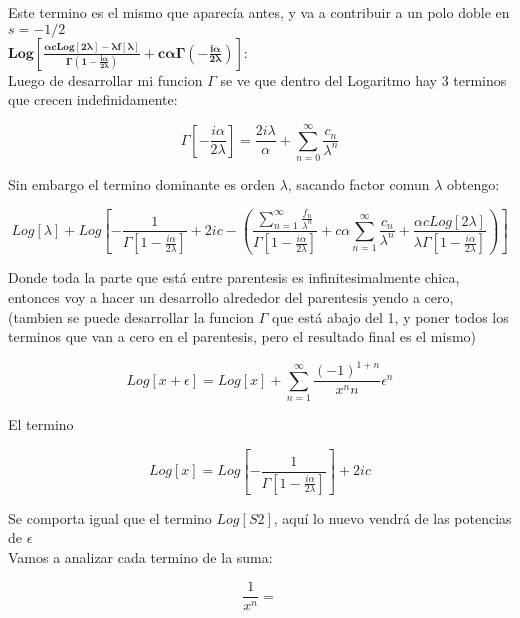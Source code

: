 Este termino es el mismo que aparecía antes, y va a contribuir a un polo doble en $s=-1/2$  \\

$\mathbf{
Log[
	\frac{\alpha c Log[2 \lambda] - \lambda f[\lambda] }{\Gamma (1- \frac{i \alpha}{ 2 \lambda})} + 
	c \alpha \Gamma (- \frac{i \alpha}{2 \lambda}) ] :
}$ \\

Luego de desarrollar mi funcion $\Gamma$ se ve que dentro del Logaritmo hay 3 terminos que crecen indefinidamente:

\begin{equation}
\Gamma [- \frac{i \alpha}{2 \lambda}] = 
\frac{2 i \lambda}{\alpha} + 
\sum _{n=0} ^{\infty} \frac{c _n}{\lambda ^n}
\end{equation}

Sin embargo el termino dominante es orden $\lambda$, sacando factor comun $\lambda$ obtengo:

\begin{equation}
Log[\lambda] + 
Log \left[
	- \frac{1}{\Gamma[1- \frac{i \alpha}{2 \lambda}]} +
	2 i c -
	\left(
		\frac{\sum _{n=1} ^{\infty} \frac{f _n}{\lambda ^n}}
			 {\Gamma[1- \frac{i \alpha}{2 \lambda}]}		
		+ c \alpha \sum _{n=1} ^{\infty} \frac{c _n}{\lambda ^n} +
		\frac{\alpha c Log[2 \lambda]}{\lambda \Gamma [1 - \frac{i \alpha}{2 \lambda} ]}	
		\right)
		\right]		
\end{equation}


Donde toda la parte que está entre parentesis es infinitesimalmente chica, entonces voy a hacer un desarrollo alrededor del parentesis yendo a cero, (tambien se puede desarrollar la funcion $\Gamma$ que está abajo del 1, y poner todos los terminos que van a cero en el parentesis, pero el resultado final es el mismo)

\begin{equation}
Log[x + \epsilon] =
Log[x] + 
\sum _{n=1} ^{\infty}
	\frac{(-1) ^{1+n} }
     	{x ^n n}
     \epsilon ^{n}
\end{equation}

El termino 

\begin{equation}
Log[x] = 
Log \left[
		- \frac{1}{\Gamma [1 - \frac{i \alpha}{2 \lambda}]}
		\right] + 
2 i c
\end{equation}

Se comporta igual que el termino $ Log[S2] $, aquí lo nuevo vendrá de las potencias de $\epsilon$ \\
Vamos a analizar cada termino de la suma:

\begin{equation}
\frac{1}{x ^n} = 

\end{equation}



